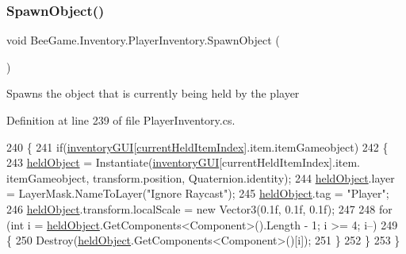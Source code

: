\subsubsection{\texorpdfstring{Spawn\+Object()}{SpawnObject()}}
{\footnotesize\ttfamily void Bee\+Game.\+Inventory.\+Player\+Inventory.\+Spawn\+Object (\begin{DoxyParamCaption}{ }\end{DoxyParamCaption})\hspace{0.3cm}{\ttfamily [private]}}



Spawns the object that is currently being held by the player 



Definition at line 239 of file Player\+Inventory.\+cs.


\begin{DoxyCode}
240         \{
241             \textcolor{keywordflow}{if}(\hyperlink{class_bee_game_1_1_inventory_1_1_inventory_base_a48dcba7ad7bfa1bed8c9ae290fb32857}{inventoryGUI}[\hyperlink{class_bee_game_1_1_inventory_1_1_player_inventory_ac2978979c5c8e45fccc7d3a10882ea1b}{currentHeldItemIndex}].item.itemGameobject)
242             \{
243                 \hyperlink{class_bee_game_1_1_inventory_1_1_player_inventory_ae30e4d599863e910244ff52ba53a1dfb}{heldObject} = Instantiate(\hyperlink{class_bee_game_1_1_inventory_1_1_inventory_base_a48dcba7ad7bfa1bed8c9ae290fb32857}{inventoryGUI}[currentHeldItemIndex].item.
      itemGameobject, transform.position, Quaternion.identity);
244                 \hyperlink{class_bee_game_1_1_inventory_1_1_player_inventory_ae30e4d599863e910244ff52ba53a1dfb}{heldObject}.layer = LayerMask.NameToLayer(\textcolor{stringliteral}{"Ignore Raycast"});
245                 \hyperlink{class_bee_game_1_1_inventory_1_1_player_inventory_ae30e4d599863e910244ff52ba53a1dfb}{heldObject}.tag = \textcolor{stringliteral}{"Player"};
246                 \hyperlink{class_bee_game_1_1_inventory_1_1_player_inventory_ae30e4d599863e910244ff52ba53a1dfb}{heldObject}.transform.localScale = \textcolor{keyword}{new} Vector3(0.1f, 0.1f, 0.1f);
247 
248                 \textcolor{keywordflow}{for} (\textcolor{keywordtype}{int} i = \hyperlink{class_bee_game_1_1_inventory_1_1_player_inventory_ae30e4d599863e910244ff52ba53a1dfb}{heldObject}.GetComponents<Component>().Length - 1; i >= 4; i--)
249                 \{
250                     Destroy(\hyperlink{class_bee_game_1_1_inventory_1_1_player_inventory_ae30e4d599863e910244ff52ba53a1dfb}{heldObject}.GetComponents<Component>()[i]);
251                 \}
252             \}
253         \}
\end{DoxyCode}
\mbox{\label{class_bee_game_1_1_inventory_1_1_player_inventory_a3cda67cea8a2cae1ce032a8f0d74912a}} 
